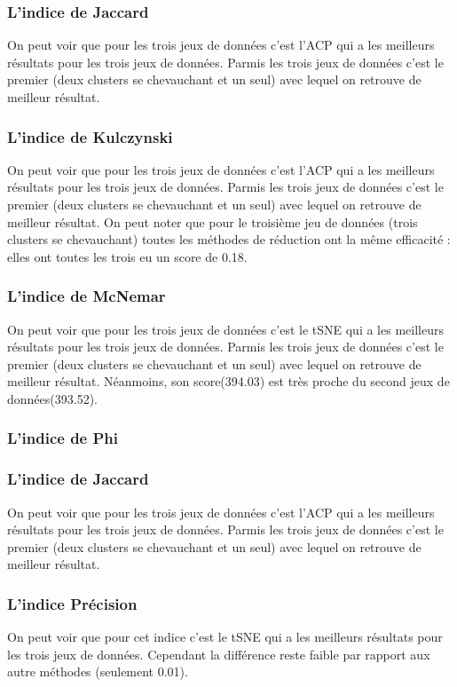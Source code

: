 \subsubsection{L'indice de Jaccard}
On peut voir que pour les trois jeux de données c'est l'ACP qui a les meilleurs résultats pour les trois jeux de données.
Parmis les trois jeux de données c'est le premier (deux clusters se chevauchant et un seul) avec lequel on retrouve de meilleur résultat.

\subsubsection{L'indice de Kulczynski}
On peut voir que pour les trois jeux de données c'est l'ACP qui a les meilleurs résultats pour les trois jeux de données.
Parmis les trois jeux de données c'est le premier (deux clusters se chevauchant et un seul) avec lequel on retrouve de meilleur résultat.
On peut noter que pour le troisième jeu de données (trois clusters se chevauchant) toutes les méthodes de réduction ont la même efficacité : 
elles ont toutes les trois eu un score de 0.18.


\subsubsection{L'indice de McNemar}
On peut voir que pour les trois jeux de données c'est le tSNE qui a les meilleurs résultats pour les trois jeux de données.
Parmis les trois jeux de données c'est le premier (deux clusters se chevauchant et un seul) avec lequel on retrouve de meilleur résultat.
Néanmoins, son score(394.03) est très proche du second jeux de données(393.52).

\subsubsection{L'indice de Phi}


\subsubsection{L'indice de Jaccard}
On peut voir que pour les trois jeux de données c'est l'ACP qui a les meilleurs résultats pour les trois jeux de données.
Parmis les trois jeux de données c'est le premier (deux clusters se chevauchant et un seul) avec lequel on retrouve de meilleur résultat.

\subsubsection{L'indice Précision}
On peut voir que pour cet indice c'est le tSNE qui a les meilleurs résultats pour les trois jeux de données.
Cependant la différence reste faible par rapport aux autre méthodes (seulement 0.01).

